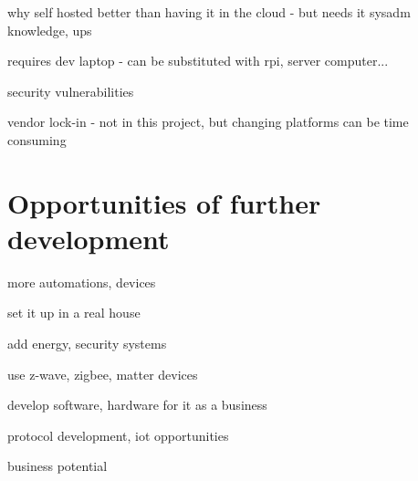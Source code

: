 why self hosted better than having it in the cloud - but needs it sysadm knowledge, ups

requires dev laptop - can be substituted with rpi, server computer...

security vulnerabilities

vendor lock-in - not in this project, but changing platforms can be time consuming

\section{Opportunities of further development}

more automations, devices

set it up in a real house

add energy, security systems

use z-wave, zigbee, matter devices

develop software, hardware for it as a business

protocol development, iot opportunities

business potential
